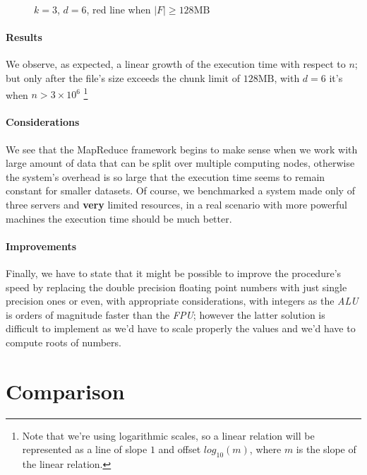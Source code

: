 \documentclass[parskip=full]{report}
\begin{document}
\begin{figure}[H]
	\centering
	\caption{$k=3$, $d=6$, red line when $|F| \ge 128\text{MB}$}
\end{figure}

\paragraph{Results}
We observe, as expected, a linear growth of the execution time with respect to 
$n$; but only after the file's size exceeds the chunk limit of $128\text{MB}$, 
with $d = 6$ it's when $n > 3 \times 10^6$
\footnote{
	Note that we're using 
	logarithmic scales, so a linear relation will 
	be represented as a line of slope $1$ and offset $log_{10}(m)$, where $m$ 
	is the slope of the linear relation.
}

\paragraph{Considerations}
We see that the MapReduce framework begins to make sense when we work with large amount of data that can be split over multiple computing nodes, otherwise the system's overhead is so large that the execution time seems to remain constant for smaller datasets. Of course, we benchmarked a system made only of three servers and \textbf{very} limited resources, in a real scenario with more powerful machines the execution time should be much better.

\paragraph{Improvements}
Finally, we have to state that it might be possible to improve the procedure's speed by replacing the double precision floating point numbers with just single precision ones or even, with appropriate considerations, with integers as the \textit{ALU} is orders of magnitude faster than the \textit{FPU}; however the latter solution is difficult to implement as we'd have to scale properly the values and we'd have to compute roots of numbers.

\section{Comparison}
\end{document}
